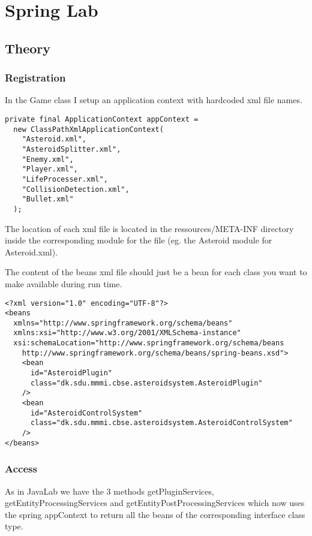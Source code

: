 \section{Spring Lab}

\subsection{Theory}
\subsubsection{Registration}
In the Game class I setup an application context with hardcoded xml file names.
\begin{verbatim}
private final ApplicationContext appContext =
  new ClassPathXmlApplicationContext(
    "Asteroid.xml",
    "AsteroidSplitter.xml", 
    "Enemy.xml",
    "Player.xml",
    "LifeProcesser.xml",
    "CollisionDetection.xml",
    "Bullet.xml"
  );
\end{verbatim}

The location of each xml file is located in the ressources/META-INF directory
inside the corresponding module for the file (eg. the Asteroid module for
Asteroid.xml).

The content of the beans xml file should just be a bean for each class you want
to make available during run time.

\begin{verbatim}
<?xml version="1.0" encoding="UTF-8"?>
<beans
  xmlns="http://www.springframework.org/schema/beans"
  xmlns:xsi="http://www.w3.org/2001/XMLSchema-instance"
  xsi:schemaLocation="http://www.springframework.org/schema/beans 
    http://www.springframework.org/schema/beans/spring-beans.xsd">
    <bean 
      id="AsteroidPlugin"
      class="dk.sdu.mmmi.cbse.asteroidsystem.AsteroidPlugin"
    />
    <bean
      id="AsteroidControlSystem"
      class="dk.sdu.mmmi.cbse.asteroidsystem.AsteroidControlSystem"
    />
</beans>
\end{verbatim}

\subsubsection{Access}
As in JavaLab we have the 3 methods getPluginServices,
getEntityProcessingServices and getEntityPostProcessingServices which now uses
the spring appContext to return all the beans of the corresponding interface
class type.

